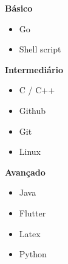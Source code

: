 \documentclass[10pt,a4paper,ragged2e]{altacv}
\begin{document}

{}

{\Large \textbf{Básico}\par\par}
\vspace{5pt}
\begin{itemize}
    \item Go
    \item Shell script
\end{itemize}

{\Large \textbf{Intermediário}\par\par}
\vspace{5pt}
\begin{itemize}
    \item C / C++
    \item Github 
    \item Git 
    \item Linux
\end{itemize}

{\Large \textbf{Avançado}\par\par}
\vspace{5pt}
\begin{itemize}
\item Java
\item Flutter
\item Latex
\item Python
\end{itemize} 



\end{document}
